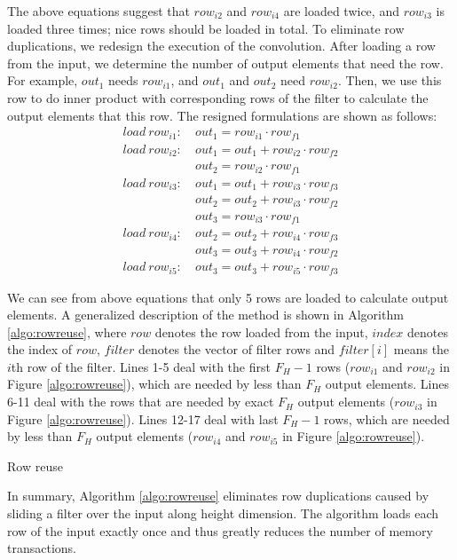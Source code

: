 The above equations suggest that $row_{i2}$ and $row_{i4}$ are loaded twice, and $row_{i3}$ is loaded three times; nice rows should be loaded in total. To eliminate row duplications, we redesign the execution of the convolution. After loading a row from the input, we determine the number of output elements that need the row. For example, $out_1$ needs $row_{i1}$, and $out_1$ and $out_2$ need $row_{i2}$. Then, we use
this row to do inner product with corresponding rows of the filter to calculate the output elements that this row. The resigned formulations are shown as follows:
\begin{equation}\nonumber
\begin{aligned}
load\ row_{i1}:
&\ out_1=row_{i1} \cdot row_{f1} \\
load\ row_{i2}:
&\ out_1 = out_1+row_{i2} \cdot row_{f2}\\
&\ out_2=row_{i2} \cdot row_{f1}\\
load\ row_{i3}:
&\ out_1 = out_1+row_{i3} \cdot row_{f3}\\
&\ out_2 = out_2+row_{i3} \cdot row_{f2}\\
&\ out_{3}=row_{i3} \cdot row_{f1}\\
load\ row_{i4}:
&\ out_2=out_2+row_{i4} \cdot row_{f3} \\
&\ out_3=out_3+row_{i4} \cdot row_{f2}\\
load\ row_{i5}:
&\ out_3=out_3+row_{i5} \cdot row_{f3}
\end{aligned}	
\end{equation}



We can see from above equations that only 5 rows are loaded to calculate output elements. A generalized description of the method is
shown in Algorithm \ref{algo:rowreuse}, where $row$ denotes the row loaded from the input, $index$ denotes the index of $row$, $filter$ denotes
the vector of filter rows and $filter[i]$ means the $i$th row of the filter. Lines 1-5 deal with the first $F_H-1$ rows ($row_{i1}$ and $row_{i2}$ in Figure \ref{algo:rowreuse}), which
are needed by less than $F_H$ output elements. Lines 6-11 deal with the rows that are needed by exact $F_H$ output elements ($row_{i3}$ in
Figure \ref{algo:rowreuse}). Lines 12-17 deal with last $F_H-1$ rows, which are needed by less than $F_H$ output elements ($row_{i4}$
and $row_{i5}$ in Figure \ref{algo:rowreuse}).

\begin{algorithm}
	\caption{Row reuse}
	\label{algo:rowreuse}
\end{algorithm}

In summary, Algorithm \ref{algo:rowreuse} eliminates row duplications caused by sliding a filter over the input along height dimension. The
algorithm loads each row of the input exactly once and thus greatly reduces the number of memory transactions.

